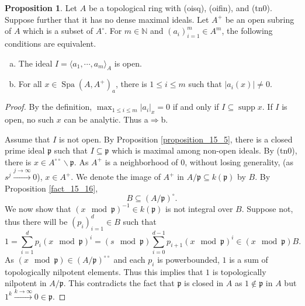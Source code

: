\documentclass[10pt]{article}
\numberwithin{equation}{section}
\theoremstyle{definition}
\newtheorem{proposition}{Proposition}[subsection]
\DeclareMathOperator{\supp}{supp}
\DeclareMathOperator{\Spa}{Spa}
\newcommand{\N}[0]{\mathbb{N}}
\newcommand{\p}[0]{\mathfrak{p}}
\newcommand{\ab}[1]{\vert #1 \vert}
\newcommand{\dcirc}[0]{{\circ\circ}}
\begin{document}
\begin{proposition}
    \label{proposition_15_6}
    Let $A$ be a topological ring with (oisq), (oifin), and (tn0). Suppose further that it has no dense maximal ideals.
    Let $A^+$ be an open subring of $A$ which is a subset of $A^\circ$. For $m\in\N$ and $(a_i)_{i=1}^m\in A^m$, the following conditions are equivalent.
    \begin{enumerate}[a.]
        \item The ideal $I=\langle a_1,\cdots,a_m\rangle_A$ is open.
        \item For all $x\in\Spa(A,A^+)_a$, there is $1\leq i\leq m$ such that $\ab{a_i(x)}\not=0$.
    \end{enumerate}
\end{proposition}

\begin{proof}
    By the definition, $\max_{1\leq i\leq m}\ab{a_i}_x=0$ if and only if $I\subseteq\supp x$. If $I$ is open, no such $x$ can be analytic. Thus a$\Rightarrow$b.
    \par Assume that $I$ is not open. By Proposition \ref{proposition_15_5}, there is a closed prime ideal $\p$ such that $I\subseteq \p$ which is maximal among non-open ideals. By (tn0), there is $x\in A^\dcirc\backslash\p$. As $A^+$ is a neighborhood of $0$, without losing generality, (as $s^j\stackrel{j\to\infty}{\to} 0$), $x\in A^+$.
    We denote the image of $A^+$ in $A/\p\subseteq k(\p)$ by $B$. By Proposition \ref{fact_15_16},
    \begin{equation}
        B\subseteq(A/\p)^\circ.
    \end{equation}
    We now show that $(x\mod\p)^{-1}\in k(\p)$ is not integral over $B$. Suppose not, thus there will be $(p_i)^d_{i=1}\in B$ such that
    \begin{equation*}
        1 = \sum_{i=1}^d p_i(x\mod\p)^i = (s\mod\p)\sum_{i=0}^{d-1}p_{i+1}(x\mod\p)^i \in (x\mod\p)B.
    \end{equation*}
As $(x\mod\p)\in (A/\p)^\dcirc$ and each $p_i$ is powerbounded, $1$ is a sum of topologically nilpotent elements. Thus this implies that $1$ is topologically nilpotent in $A/\p$. This contradicts the fact that $\p$ is closed in $A$ as $1\not\in\p$ in $A$ but $1^k\stackrel{k\to\infty}{\to}0\in\p$.

\end{proof}
\end{document}
